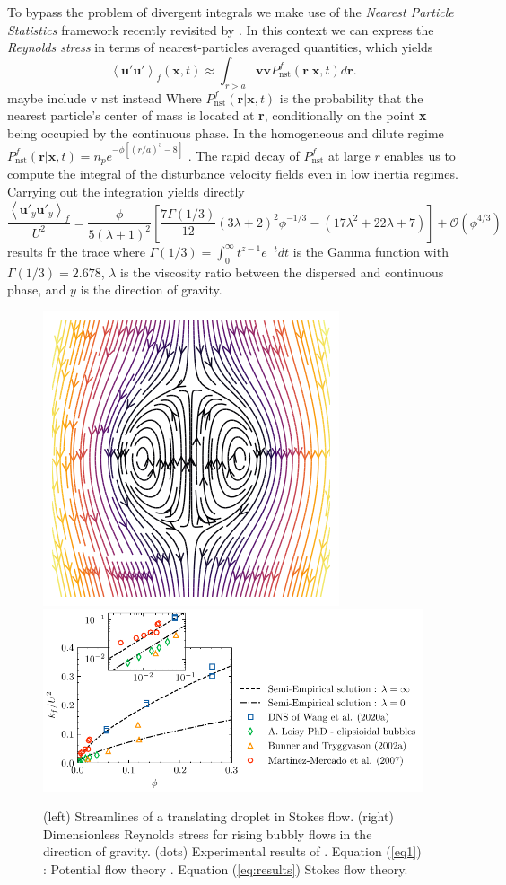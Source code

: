 \documentclass[12pt,a4paper]{article}
\newcommand{\avg}[1]{\left<#1\right>}
\renewcommand{\avg}[1]{\left<#1\right>}
\newcommand{\tb}[1]{\color{blue}#1\color{black}}
\begin{document}
To bypass the problem of divergent integrals we make use of the  \textit{Nearest Particle Statistics} framework recently revisited by \cite{zhang2021ensemble}. 
In this context we can express the \textit{Reynolds stress} in terms of nearest-particles averaged quantities, which yields
\begin{equation*}
    \avg{\textbf{u}'\textbf{u}'}_f(\textbf{x},t)
    \approx
    \int_{r >a}  \textbf{v}  \textbf{v} P_\text{nst}^f(\textbf{r}|\textbf{x},t) d\textbf{r}.
\end{equation*}
\tb{maybe include v nst instead}
Where $P_\text{nst}^f(\textbf{r}|\textbf{x},t)$ is the probability that the nearest particle's center of mass is located at \textbf{r}, conditionally on the point \textbf{x} being occupied by the continuous phase.
In the homogeneous and dilute regime $P_\text{nst}^f(\textbf{r}|\textbf{x},t) = n_p e^{- \phi [(r/a)^3 - 8]}$ \cite{zhang2021ensemble}.
The rapid decay of $P_\text{nst}^f$ at large $r$ enables us to compute the integral of the disturbance velocity fields even in low inertia regimes. 
Carrying out the integration yields directly 
\begin{equation}
    \frac{\avg{\textbf{u}'_y\textbf{u}'_y}_f}{U^2}
    = \frac{\phi}{5(\lambda +1)^2}\left[
        \frac{7 \Gamma\left(1/3\right)}{12}(3\lambda+2)^2    \phi^{-1/3}
        - (17\lambda^2+22\lambda+7)
        \right]
        + \mathcal{O}(\phi^{4/3})
        \label{eq:results}
\end{equation}
\tb{results fr the trace }
where $\Gamma(1/3) = \int_0^\infty t^{z-1} e^{-t} dt$ is the Gamma function with $\Gamma(1/3)= 2.678$, $\lambda$ is the viscosity ratio between the dispersed and continuous phase, and $y$ is the direction of gravity. 
\begin{figure}[h!]
    \centering
    \includegraphics[height=0.25\textwidth]{image/Rising_Stokes.png}
    \includegraphics[height=0.3\textwidth]{image/HOMOGENEOUS_final/CA/KFliterature.pdf}
    \caption{(left) Streamlines of a translating droplet in Stokes flow. 
            (right) Dimensionless Reynolds stress for rising bubbly flows in the direction of gravity. 
            (dots) Experimental results of \cite{cartellier2009induced}. 
            Equation (\ref{eq1}) : Potential flow theory \cite{van1982bubble}. 
            Equation (\ref{eq:results}) Stokes flow theory. 
            }
    \label{fig:wake}
\end{figure}
\end{document}
